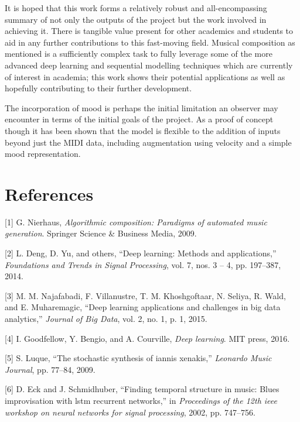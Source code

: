 \documentclass[12pt,]{article}
\begin{document}
It is hoped that this work forms a relatively robust and
all-encompassing summary of not only the outputs of the project but the
work involved in achieving it. There is tangible value present for other
academics and students to aid in any further contributions to this
fast-moving field. Musical composition as mentioned is a sufficiently
complex task to fully leverage some of the more advanced deep learning
and sequential modelling techniques which are currently of interest in
academia; this work shows their potential applications as well as
hopefully contributing to their further development.

The incorporation of mood is perhaps the initial limitation an observer
may encounter in terms of the initial goals of the project. As a proof
of concept though it has been shown that the model is flexible to the
addition of inputs beyond just the MIDI data, including augmentation
using velocity and a simple mood representation.

\hypertarget{references}{%
\section*{References}\label{references}}

\hypertarget{refs}{}
\leavevmode\hypertarget{ref-nierhaus2009algorithmic}{}%
{[}1{]} G. Nierhaus, \emph{Algorithmic composition: Paradigms of
automated music generation}. Springer Science \& Business Media, 2009.

\leavevmode\hypertarget{ref-deng2014deep}{}%
{[}2{]} L. Deng, D. Yu, and others, ``Deep learning: Methods and
applications,'' \emph{Foundations and Trends in Signal Processing}, vol.
7, nos. 3 -- 4, pp. 197--387, 2014.

\leavevmode\hypertarget{ref-najafabadi2015deep}{}%
{[}3{]} M. M. Najafabadi, F. Villanustre, T. M. Khoshgoftaar, N. Seliya,
R. Wald, and E. Muharemagic, ``Deep learning applications and challenges
in big data analytics,'' \emph{Journal of Big Data}, vol. 2, no. 1, p.
1, 2015.

\leavevmode\hypertarget{ref-goodfellow2016deep}{}%
{[}4{]} I. Goodfellow, Y. Bengio, and A. Courville, \emph{Deep
learning}. MIT press, 2016.

\leavevmode\hypertarget{ref-luque2009stochastic}{}%
{[}5{]} S. Luque, ``The stochastic synthesis of iannis xenakis,''
\emph{Leonardo Music Journal}, pp. 77--84, 2009.

\leavevmode\hypertarget{ref-eck2002finding}{}%
{[}6{]} D. Eck and J. Schmidhuber, ``Finding temporal structure in
music: Blues improvisation with lstm recurrent networks,'' in
\emph{Proceedings of the 12th ieee workshop on neural networks for
signal processing}, 2002, pp. 747--756.
\end{document}
